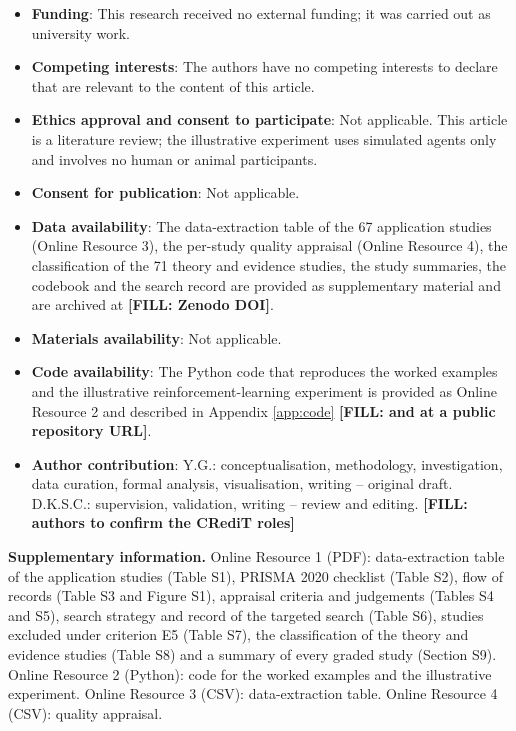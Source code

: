 \documentclass[pdflatex,sn-basic]{sn-jnl}
\newcommand{\fillin}[1]{{\color{red}\bfseries [FILL: #1]}}
\begin{document}
\begin{itemize}
\item \textbf{Funding}: This research received no external funding; it was carried out as university work.
\item \textbf{Competing interests}: The authors have no competing interests to declare that are relevant to the content of this article.
\item \textbf{Ethics approval and consent to participate}: Not applicable. This article is a literature review; the illustrative experiment uses simulated agents only and involves no human or animal participants.
\item \textbf{Consent for publication}: Not applicable.
\item \textbf{Data availability}: The data-extraction table of the 67 application studies (Online Resource 3), the per-study quality appraisal (Online Resource 4), the classification of the 71 theory and evidence studies, the study summaries, the codebook and the search record are provided as supplementary material and are archived at \fillin{Zenodo DOI}.
\item \textbf{Materials availability}: Not applicable.
\item \textbf{Code availability}: The Python code that reproduces the worked examples and the illustrative reinforcement-learning experiment is provided as Online Resource 2 and described in Appendix \ref{app:code} \fillin{and at a public repository URL}.
\item \textbf{Author contribution}: Y.G.: conceptualisation, methodology, investigation, data curation, formal analysis, visualisation, writing -- original draft. D.K.S.C.: supervision, validation, writing -- review and editing. \fillin{authors to confirm the CRediT roles}
\end{itemize}

\noindent\textbf{Supplementary information.} Online Resource 1 (PDF): data-extraction table of the application studies (Table S1), PRISMA 2020 checklist (Table S2), flow of records (Table S3 and Figure S1), appraisal criteria and judgements (Tables S4 and S5), search strategy and record of the targeted search (Table S6), studies excluded under criterion E5 (Table S7), the classification of the theory and evidence studies (Table S8) and a summary of every graded study (Section S9). Online Resource 2 (Python): code for the worked examples and the illustrative experiment. Online Resource 3 (CSV): data-extraction table. Online Resource 4 (CSV): quality appraisal.
\end{document}
